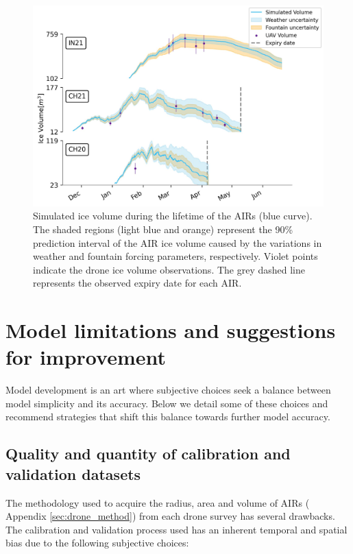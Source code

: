 \begin{figure}
  \centering
	\includegraphics[width=\linewidth]{figs/model_validation.jpg}
	\caption{Simulated ice volume during the lifetime of the \ac{AIRs} (blue curve). The shaded regions (light blue and
		orange) represent the 90\% prediction interval of the AIR ice volume caused by the variations in weather and
    fountain forcing parameters, respectively. Violet points indicate the drone ice volume observations.  The grey
  dashed line represents the observed expiry date for each AIR.  }
	\label{fig:results}
\end{figure}


\section{Model limitations and suggestions for improvement}

Model development is an art where subjective choices seek a balance between model simplicity and its accuracy.
Below we detail some of these choices and recommend strategies that shift this balance towards further model
accuracy.

\subsection{Quality and quantity of calibration and validation datasets}

The methodology used to acquire the radius, area and volume of \ac{AIRs} ( Appendix \ref{sec:drone_method}) from
each drone survey has several drawbacks. The calibration and validation process used has an inherent temporal
and spatial bias due to the following subjective choices:

